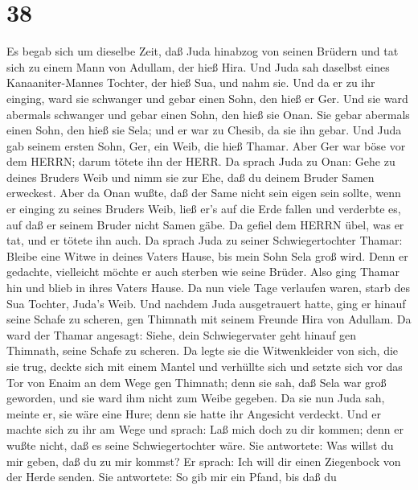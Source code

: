 \hypertarget{section-37}{%
\section{38}\label{section-37}}

 Es begab sich um dieselbe Zeit, daß Juda hinabzog von
seinen Brüdern und tat sich zu einem Mann von Adullam, der hieß Hira.
 Und Juda sah daselbst eines Kanaaniter-Mannes Tochter, der
hieß Sua, und nahm sie. Und da er zu ihr einging,  ward sie
schwanger und gebar einen Sohn, den hieß er Ger.  Und sie
ward abermals schwanger und gebar einen Sohn, den hieß sie Onan.
 Sie gebar abermals einen Sohn, den hieß sie Sela; und er
war zu Chesib, da sie ihn gebar.  Und Juda gab seinem ersten
Sohn, Ger, ein Weib, die hieß Thamar.  Aber Ger war böse vor
dem HERRN; darum tötete ihn der HERR.  Da sprach Juda zu
Onan: Gehe zu deines Bruders Weib und nimm sie zur Ehe, daß du deinem
Bruder Samen erweckest.  Aber da Onan wußte, daß der Same
nicht sein eigen sein sollte, wenn er einging zu seines Bruders Weib,
ließ er's auf die Erde fallen und verderbte es, auf daß er seinem Bruder
nicht Samen gäbe.  Da gefiel dem HERRN übel, was er tat,
und er tötete ihn auch.  Da sprach Juda zu seiner
Schwiegertochter Thamar: Bleibe eine Witwe in deines Vaters Hause, bis
mein Sohn Sela groß wird. Denn er gedachte, vielleicht möchte er auch
sterben wie seine Brüder. Also ging Thamar hin und blieb in ihres Vaters
Hause.  Da nun viele Tage verlaufen waren, starb des Sua
Tochter, Juda's Weib. Und nachdem Juda ausgetrauert hatte, ging er
hinauf seine Schafe zu scheren, gen Thimnath mit seinem Freunde Hira von
Adullam.  Da ward der Thamar angesagt: Siehe, dein
Schwiegervater geht hinauf gen Thimnath, seine Schafe zu scheren.
 Da legte sie die Witwenkleider von sich, die sie trug,
deckte sich mit einem Mantel und verhüllte sich und setzte sich vor das
Tor von Enaim an dem Wege gen Thimnath; denn sie sah, daß Sela war groß
geworden, und sie ward ihm nicht zum Weibe gegeben.  Da sie
nun Juda sah, meinte er, sie wäre eine Hure; denn sie hatte ihr
Angesicht verdeckt.  Und er machte sich zu ihr am Wege und
sprach: Laß mich doch zu dir kommen; denn er wußte nicht, daß es seine
Schwiegertochter wäre. Sie antwortete: Was willst du mir geben, daß du
zu mir kommst?  Er sprach: Ich will dir einen Ziegenbock
von der Herde senden. Sie antwortete: So gib mir ein Pfand, bis daß du
